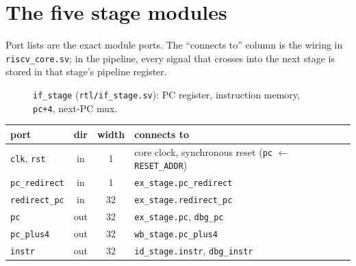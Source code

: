\documentclass[10pt]{article}
\newcommand{\sv}[1]{\texttt{#1}}
\begin{document}
\clearpage
\section*{The five stage modules}
Port lists are the exact module ports. The ``connects to'' column is the wiring in \sv{riscv\_core.sv};
in the pipeline, every signal that crosses into the next stage is stored in that stage's pipeline register.

\begin{figure}[h]
  \centering
  
  \caption{\sv{if\_stage} (\sv{rtl/if\_stage.sv}): PC register, instruction memory, \sv{pc+4}, next-PC mux.}
\end{figure}
\begin{center}\small
\begin{tabular}{l c c L{11cm}}
\toprule
port & dir & width & connects to\\ \midrule
\sv{clk}, \sv{rst} & in & 1 & core clock, synchronous reset (\sv{pc} $\leftarrow$ \sv{RESET\_ADDR})\\
\sv{pc\_redirect} & in & 1 & \sv{ex\_stage.pc\_redirect}\\
\sv{redirect\_pc} & in & 32 & \sv{ex\_stage.redirect\_pc}\\
\sv{pc} & out & 32 & \sv{ex\_stage.pc}, \sv{dbg\_pc}\\
\sv{pc\_plus4} & out & 32 & \sv{wb\_stage.pc\_plus4}\\
\sv{instr} & out & 32 & \sv{id\_stage.instr}, \sv{dbg\_instr}\\ \bottomrule
\end{tabular}
\end{center}
\end{document}
